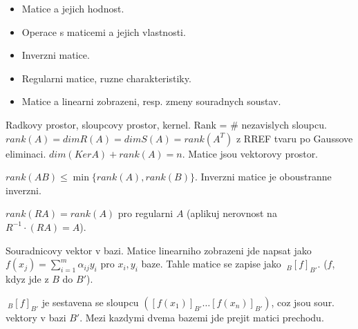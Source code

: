 \begin{itemize}
\item Matice a jejich hodnost.
\item Operace s maticemi a jejich vlastnosti.
\item Inverzni matice.
\item Regularni matice, ruzne charakteristiky.
\item Matice a linearni zobrazeni, resp. zmeny souradnych soustav.
\end{itemize}

Radkovy prostor, sloupcovy prostor, kernel. Rank = \# nezavislych sloupcu.
$rank(A)=dim R(A)=dim S(A)=rank(A^T)$ z RREF tvaru po Gaussove eliminaci.
$dim(Ker A)+rank(A)=n$. Matice jsou vektorovy prostor.

$rank(AB)\leq\min\{rank(A),rank(B)\}$. Inverzni matice je oboustranne inverzni.

$rank(RA)=rank(A)$ pro regularni $A$ (aplikuj nerovnost na $R^{-1}\cdot(RA)=A$).

Souradnicovy vektor v bazi. Matice linearniho zobrazeni jde napsat jako
$f(x_j)=\sum_{i=1}^m \alpha_{ij}y_i$ pro $x_i,y_i$ baze. Tahle matice
se zapise jako $\ _{B}[f]_{B'}$. ($f$, kdyz jde z $B$ do $B'$).

$\ _{B}[f]_{B'}$ je sestavena se sloupcu $([f(x_1)]_{B'}\ldots [f(x_n)]_{B'})$,
coz jsou sour. vektory v bazi $B'$.
Mezi kazdymi dvema bazemi jde prejit matici prechodu.
